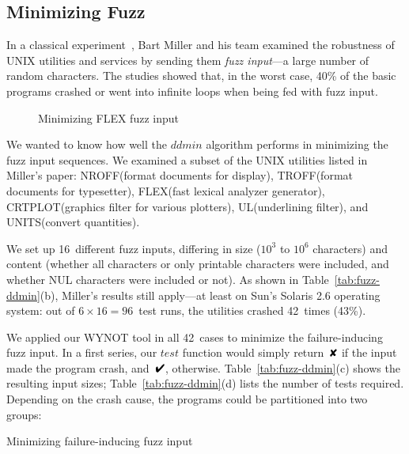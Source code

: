 \documentclass{acm_proc_article-sp}
\newcommand{\COL}        {{\small COL}\xspace}
\newcommand{\CRTPLOT}    {{\small CRTPLOT}\xspace}
\newcommand{\FLEX}       {{\small FLEX}\xspace}
\newcommand{\NROFF}      {{\small NROFF}\xspace}
\newcommand{\TROFF}      {{\small TROFF}\xspace}
\newcommand{\UNIX}       {{\small UNIX}\xspace}
\newcommand{\UL}         {{\small UL}\xspace}
\newcommand{\UNITS}      {{\small UNITS}\xspace}
\newcommand{\WYNOT}      {{\small WYNOT}\xspace}
\newcommand{\PASS}{\text{\ding{52}}\xspace}
\newcommand{\FAIL}{\text{\ding{56}}\xspace}
\newcommand{\test}{\textit{test}\xspace}
\newcommand{\ddmin}{\textit{ddmin}\xspace}
\theoremstyle{plain}
\begin{document}
\subsection{Minimizing Fuzz}
\label{sec:fuzz}

\noindent
In a classical experiment~\cite{miller/etal/90/cacm,
  miller/etal/95/fuzz}, Bart Miller and his team examined the
robustness of \UNIX utilities and services by sending them \emph{fuzz
  input}---a large number of random characters.  The studies showed
that, in the worst case, 40\% of the basic programs crashed or went
into infinite loops when being fed with fuzz input.


\begin{figure}[t]
\vspace{-1.1cm}
\vspace{-0.5cm}
\caption{Minimizing \FLEX fuzz input}
\label{fig:flex-fuzz}
\end{figure}


We wanted to know how well the $\ddmin$ algorithm performs in minimizing
the fuzz input sequences.  We examined a subset of the \UNIX utilities
listed in Miller's paper: 
\NROFF (format documents for display),
\TROFF (format documents for typesetter), 
\FLEX (fast lexical analyzer generator), 
\CRTPLOT (graphics filter for various plotters), 
\UL (underlining filter), and
\UNITS (convert quantities).

We set up 16~different fuzz inputs, differing in size ($10^3$ to
$10^6$ characters) and content (whether all characters or only
printable characters were included, and whether NUL characters were
included or not).  As shown in Table~\ref{tab:fuzz-ddmin}(b), Miller's
results still apply---at least on Sun's Solaris 2.6 operating system:
out of $6 \times 16 = 96$~test runs, the utilities crashed 42~times (43\%).

We applied our \WYNOT tool in all 42~cases to minimize the
failure-inducing fuzz input.  In a first series, our $\test$ function
would simply return~$\FAIL$ if the input made the program crash,
and~$\PASS$, otherwise.  Table~\ref{tab:fuzz-ddmin}(c) shows the
resulting input sizes; Table~\ref{tab:fuzz-ddmin}(d) lists the number
of tests required.  Depending on the crash cause, the programs could
be partitioned into two groups:

\begin{table*}[tp]
\begin{center}
\let\f=\footnotesize

\end{center}
\vspace{-0.25cm}
\caption{Minimizing failure-inducing fuzz input}
\label{tab:fuzz-ddmin}
\end{table*}
\end{document}
